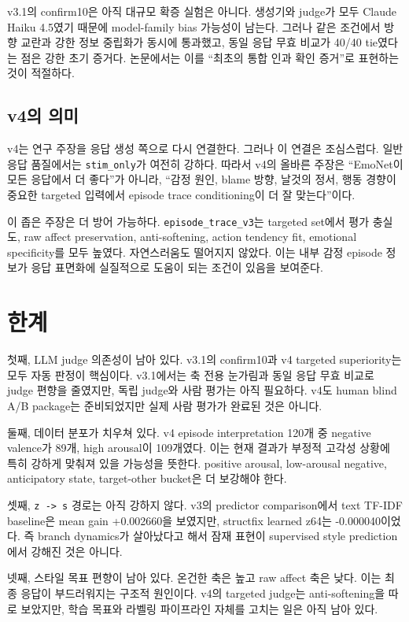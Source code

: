 \documentclass[11pt,a4paper]{article}
\newcommand{\eng}[1]{\texttt{#1}}
\begin{document}
v3.1의 confirm10은 아직 대규모 확증 실험은 아니다. 생성기와 judge가 모두 Claude Haiku 4.5였기 때문에 model-family bias 가능성이 남는다. 그러나 같은 조건에서 방향 교란과 강한 정보 중립화가 동시에 통과했고, 동일 응답 무효 비교가 40/40 tie였다는 점은 강한 초기 증거다. 논문에서는 이를 ``최초의 통합 인과 확인 증거''로 표현하는 것이 적절하다.

\subsection{v4의 의미}

v4는 연구 주장을 응답 생성 쪽으로 다시 연결한다. 그러나 이 연결은 조심스럽다. 일반 응답 품질에서는 \eng{stim\_only}가 여전히 강하다. 따라서 v4의 올바른 주장은 ``EmoNet이 모든 응답에서 더 좋다''가 아니라, ``감정 원인, blame 방향, 날것의 정서, 행동 경향이 중요한 targeted 입력에서 episode trace conditioning이 더 잘 맞는다''이다.

이 좁은 주장은 더 방어 가능하다. \eng{episode\_trace\_v3}는 targeted set에서 평가 충실도, raw affect preservation, anti-softening, action tendency fit, emotional specificity를 모두 높였다. 자연스러움도 떨어지지 않았다. 이는 내부 감정 episode 정보가 응답 표면화에 실질적으로 도움이 되는 조건이 있음을 보여준다.

\section{한계}

첫째, LLM judge 의존성이 남아 있다. v3.1의 confirm10과 v4 targeted superiority는 모두 자동 판정이 핵심이다. v3.1에서는 축 전용 눈가림과 동일 응답 무효 비교로 judge 편향을 줄였지만, 독립 judge와 사람 평가는 아직 필요하다. v4도 human blind A/B package는 준비되었지만 실제 사람 평가가 완료된 것은 아니다.

둘째, 데이터 분포가 치우쳐 있다. v4 episode interpretation 120개 중 negative valence가 89개, high arousal이 109개였다. 이는 현재 결과가 부정적 고각성 상황에 특히 강하게 맞춰져 있을 가능성을 뜻한다. positive arousal, low-arousal negative, anticipatory state, target-other bucket은 더 보강해야 한다.

셋째, \eng{z -> s} 경로는 아직 강하지 않다. v3의 predictor comparison에서 text TF-IDF baseline은 mean gain +0.002660을 보였지만, structfix learned z64는 -0.000040이었다. 즉 branch dynamics가 살아났다고 해서 잠재 표현이 supervised style prediction에서 강해진 것은 아니다.

넷째, 스타일 목표 편향이 남아 있다. 온건한 축은 높고 raw affect 축은 낮다. 이는 최종 응답이 부드러워지는 구조적 원인이다. v4의 targeted judge는 anti-softening을 따로 보았지만, 학습 목표와 라벨링 파이프라인 자체를 고치는 일은 아직 남아 있다.
\end{document}

